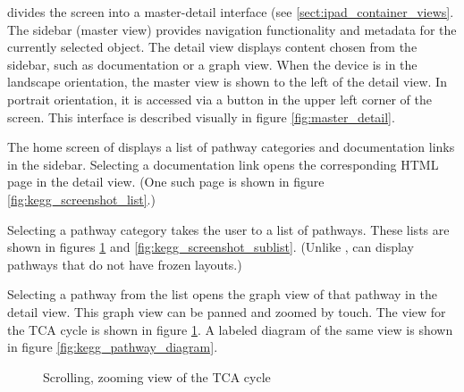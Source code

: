 \keggapp divides the screen into a master-detail interface (see
\ref{sect:ipad_container_views}. The sidebar (master view) provides navigation
functionality and metadata for the currently selected object. The detail view
displays content chosen from the sidebar, such as documentation or a graph view.
When the device is in the landscape orientation, the master view is shown to the
left of the detail view.  In portrait orientation, it is accessed via a button
in the upper left corner of the screen. This interface is described visually in
figure \ref{fig:master_detail}.

The home screen of \keggapp displays a list of pathway categories and
documentation links in the sidebar.  Selecting a documentation link opens the
corresponding HTML page in the detail view. (One such page is shown in figure
\ref{fig:kegg_screenshot_list}.)

Selecting a pathway category takes the user to a list of pathways. These lists
are shown in figures \ref{fig:kegg_screenshot_pathway} and
\ref{fig:kegg_screenshot_sublist}.  (Unlike \mawapp, \keggapp can display
pathways that do not have frozen layouts.)

Selecting a pathway from the list opens the graph view of that pathway in the
detail view. This graph view can be panned and zoomed by touch. The view for
the TCA cycle is shown in figure \ref{fig:kegg_screenshot_pathway}. A labeled
diagram of the same view is shown in figure \ref{fig:kegg_pathway_diagram}.

\begin{figure}[hbtp]
    \caption{\label{fig:kegg_screenshot_pathway} Scrolling, zooming view of
    the TCA cycle}
\end{figure}

